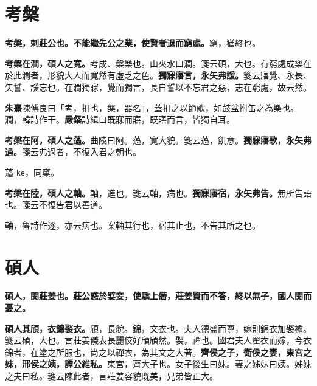 \section{考槃}


\textbf{考槃，刺莊公也。不能繼先公之業，使賢者退而窮處。}{\footnotesize 窮，猶終也。}

\textbf{考槃在澗，碩人之寬。}{\footnotesize 考成、槃樂也。山夾水曰澗。箋云碩，大也。有窮處成樂在於此澗者，形貌大人而寬然有虛乏之色。}\textbf{獨寐寤言，永矢弗諼。}{\footnotesize 箋云寤覺、永長、矢誓、諼忘也。在澗獨寐，覺而獨言，長自誓以不忘君之惡，志在窮處，故云然。}

\begin{quoting}\textbf{朱熹}陳傅良曰「考，扣也，槃，器名」，蓋扣之以節歌，如鼓盆拊缶之為樂也。澗，韓詩作干。\textbf{嚴粲}詩緝曰既寐而寤，既寤而言，皆獨自耳。\end{quoting}

\textbf{考槃在阿，碩人之薖。}{\footnotesize 曲陵曰阿。薖，寬大貌。箋云薖，飢意。}\textbf{獨寐寤歌，永矢弗過。}{\footnotesize 箋云弗過者，不復入君之朝也。}

\begin{quoting}薖 \texttt{kē}，同窠。\end{quoting}

\textbf{考槃在陸，碩人之軸。}{\footnotesize 軸，進也。箋云軸，病也。}\textbf{獨寐寤宿，永矢弗告。}{\footnotesize 無所告語也。箋云不復告君以善道。}

\begin{quoting}軸，魯詩作逐，亦云病也。案軸其行也，宿其止也，不告其所之也。\end{quoting}

\section{碩人}


\textbf{碩人，閔莊姜也。莊公惑於嬖妾，使驕上僭，莊姜賢而不答，終以無子，國人閔而憂之。}

\textbf{碩人其頎，衣錦褧衣。}{\footnotesize 頎，長貌。錦，文衣也。夫人德盛而尊，嫁則錦衣加褧襜。箋云碩，大也。言莊姜儀表長麗佼好頎頎然。褧，禪也。國君夫人翟衣而嫁，今衣錦者，在塗之所服也，尚之以禪衣，為其文之大著。}\textbf{齊侯之子，衛侯之妻，東宮之妹，邢侯之姨，譚公維私。}{\footnotesize 東宮，齊大子也。女子後生曰妹。妻之姊妹曰姨。姊妹之夫曰私。箋云陳此者，言莊姜容貌既美，兄弟皆正大。}


